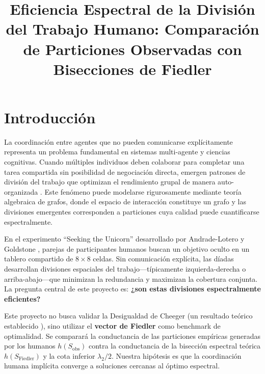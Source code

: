 \documentclass[conference]{IEEEtran}
\begin{document}
\title{Eficiencia Espectral de la División del Trabajo Humano: Comparación de Particiones Observadas con Bisecciones de Fiedler}

\author{
}

\maketitle

\section{Introducción}

La coordinación entre agentes que no pueden comunicarse explícitamente representa un problema fundamental en sistemas multi-agente y ciencias cognitivas. Cuando múltiples individuos deben colaborar para completar una tarea compartida sin posibilidad de negociación directa, emergen patrones de división del trabajo que optimizan el rendimiento grupal de manera auto-organizada \cite{andrade2021}. Este fenómeno puede modelarse rigurosamente mediante teoría algebraica de grafos, donde el espacio de interacción constituye un grafo y las divisiones emergentes corresponden a particiones cuya calidad puede cuantificarse espectralmente.

En el experimento ``Seeking the Unicorn'' desarrollado por Andrade-Lotero y Goldstone \cite{andrade2021}, parejas de participantes humanos buscan un objetivo oculto en un tablero compartido de $8 \times 8$ celdas. Sin comunicación explícita, las díadas desarrollan divisiones espaciales del trabajo---típicamente izquierda-derecha o arriba-abajo---que minimizan la redundancia y maximizan la cobertura conjunta. La pregunta central de este proyecto es: \textbf{¿son estas divisiones espectralmente eficientes?}

Este proyecto no busca validar la Desigualdad de Cheeger (un resultado teórico establecido \cite{chung1997}), sino utilizar el \textbf{vector de Fiedler} como benchmark de optimalidad. Se comparará la conductancia de las particiones empíricas generadas por los humanos $h(S_{\text{obs}})$ contra la conductancia de la bisección espectral teórica $h(S_{\text{Fiedler}})$ y la cota inferior $\lambda_2/2$. Nuestra hipótesis es que la coordinación humana implícita converge a soluciones cercanas al óptimo espectral.
\end{document}
